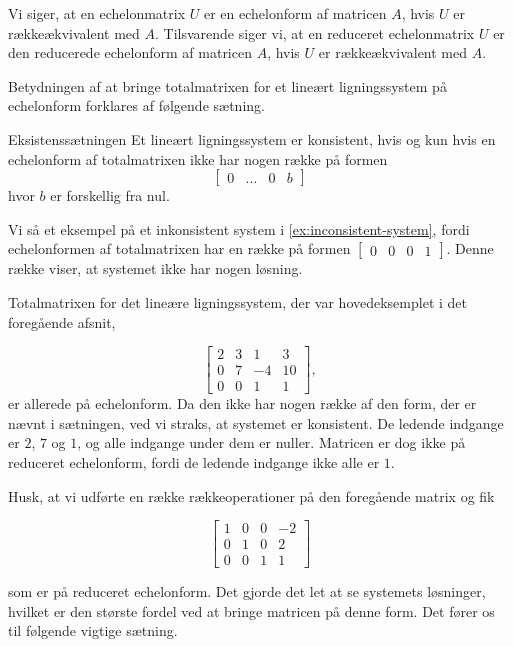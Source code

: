 Vi siger, at en echelonmatrix $U$ er en echelonform af matricen $A$, hvis $U$ er rækkeækvivalent med $A$. Tilsvarende siger vi, at en reduceret echelonmatrix $U$ er den reducerede echelonform af matricen $A$, hvis $U$ er rækkeækvivalent med $A$.

Betydningen af at bringe totalmatrixen for et lineært ligningssystem på echelonform forklares af
følgende sætning.

\begin{theorem}{Eksistenssætningen}
Et lineært ligningssystem er konsistent, hvis og kun hvis en echelonform af totalmatrixen ikke har nogen række på formen
    \[
    \left[\begin{array}{llll}
    0 & \ldots & 0 & b
    \end{array}\right]
    \]
hvor $b$ er forskellig fra nul.
\end{theorem}

Vi så et eksempel på et inkonsistent system i \autoref{ex:inconsistent-system}, fordi echelonformen af totalmatrixen har en række på formen $\left[\begin{array}{lll|l} 0 & 0 & 0 & 1 \end{array}\right]$. Denne række viser, at systemet ikke har nogen løsning.

\begin{example}
    Totalmatrixen for det lineære ligningssystem, der var hovedeksemplet i det foregående afsnit,

\[
\left[\begin{array}{cccc}
2 & 3 & 1 & 3 \\
0 & 7 & -4 & 10 \\
0 & 0 & 1 & 1
\end{array}\right] , 
\] er allerede på echelonform. Da den ikke har nogen række af den form, der er nævnt i sætningen, ved vi straks,
at systemet er konsistent. De ledende indgange er $2$, $7$ og $1$, og alle indgange under dem er nuller. Matricen er dog ikke på reduceret echelonform, fordi de ledende indgange ikke alle er $1$.
\end{example}

Husk, at vi udførte en række rækkeoperationer på den foregående matrix og fik

\[
\left[\begin{array}{cccc}
1 & 0 & 0 & -2 \\
0 & 1 & 0 & 2 \\
0 & 0 & 1 & 1
\end{array}\right]
\]

som er på reduceret echelonform. Det gjorde det let at se systemets løsninger, hvilket er den største fordel ved at bringe matricen på denne form. Det fører os til følgende vigtige sætning.

